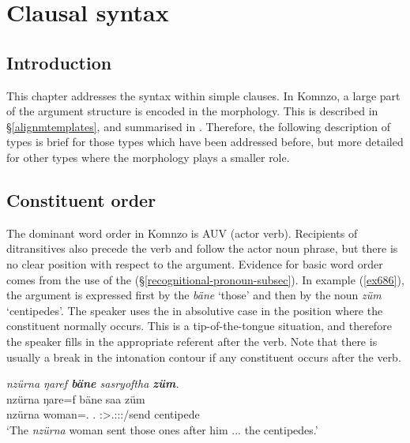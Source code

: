 
\chapter{Clausal syntax} \label{cha:clausalsyntax}

\section{Introduction}

This chapter addresses the syntax within simple clauses. In Komnzo, a large part of the argument structure is encoded in the  morphology. This is described in {\S}\ref{alignmtemplates}, and summarised in . Therefore, the following description of  types is brief for those types which have been addressed before, but more detailed for other types where the  morphology plays a smaller role.

\section{Constituent order}\label{constitorder}

The dominant word order in Komnzo is AUV (actor  verb). Recipients of ditransitives also precede the verb and follow the actor noun phrase, but there is no clear position with respect to the  argument. Evidence for basic word order comes from the use of the   ({\S}\ref{recognitional-pronoun-subsec}). In example (\ref{ex686}), the  argument is expressed first by the  \emph{bäne} `those' and then by the noun \emph{züm} `centipedes'. The speaker uses the  in absolutive case in the position where the constituent normally occurs. This is a tip-of-the-tongue situation, and therefore the speaker fills in the appropriate referent after the verb. Note that there is usually a break in the intonation contour if any constituent occurs after the verb.

\begin{exe}
	\ex \emph{nzürna ŋaref \textbf{bäne} sasryoftha \textbf{züm}.}\\
	\gll nzürna ŋare=f bäne saa züm\\
	nzürna woman=\Erg.{\Sg} \Recog.{\Abs} \Sg:\Sbj>\Tsg.\Masc:\Io:\Pst:\Pfv/send centipede\\
	\trans `The \emph{nzürna} woman sent those ones after him ... the centipedes.'\\
	\label{ex686}
\end{exe}

